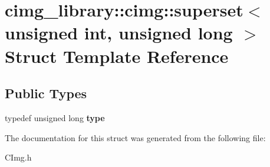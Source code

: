 \hypertarget{structcimg__library_1_1cimg_1_1superset_3_01unsigned_01int_00_01unsigned_01long_01_4}{\section{cimg\-\_\-library\-:\-:cimg\-:\-:superset$<$ unsigned int, unsigned long $>$ Struct Template Reference}
\label{structcimg__library_1_1cimg_1_1superset_3_01unsigned_01int_00_01unsigned_01long_01_4}
}
\subsection*{Public Types}
\begin{DoxyCompactItemize}
\item 
\hypertarget{structcimg__library_1_1cimg_1_1superset_3_01unsigned_01int_00_01unsigned_01long_01_4_a557b2545f66ec420858cff1dd8d3af4d}{typedef unsigned long {\bfseries type}}\label{structcimg__library_1_1cimg_1_1superset_3_01unsigned_01int_00_01unsigned_01long_01_4_a557b2545f66ec420858cff1dd8d3af4d}

\end{DoxyCompactItemize}


The documentation for this struct was generated from the following file\-:\begin{DoxyCompactItemize}
\item 
C\-Img.\-h\end{DoxyCompactItemize}
